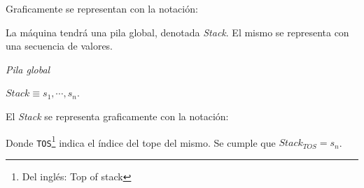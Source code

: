   Graficamente se representan con la notación:

  

  La máquina tendrá una pila global, denotada \textit{Stack}. El mismo
  se representa con una secuencia de valores.

\begin{definicion}
  \textit{Pila global}
  \begin{center}
    $\textit{Stack} \equiv s_1, \dotsb, s_n$.
  \end{center}
\end{definicion}

  El \textit{Stack} se representa graficamente con la notación:

  

  Donde \texttt{TOS}\footnote{Del inglés: Top
  of stack} indica el índice del tope del mismo.
  Se cumple que $\textit{Stack}_{TOS} = s_n$.

